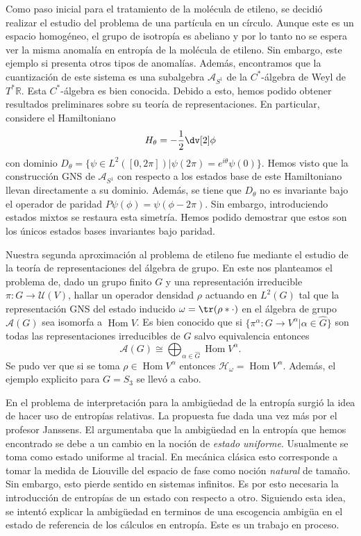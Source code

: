 \documentclass{article}
\DeclareMathOperator{\Hom}{Hom}
\begin{document}
Como paso inicial para el tratamiento de la molécula de etileno, se decidió realizar el estudio del problema de una partícula en un círculo. Aunque este es un espacio homogéneo, el grupo de isotropía es abeliano y por lo tanto no se espera ver la misma anomalía en entropía de la molécula de etileno. Sin embargo, este ejemplo si presenta otros tipos de anomalías\cite{Balachandran2011}. Además, encontramos que la cuantización de este sistema es una subalgebra $\mathcal{A}_{S^1}$ de la $C^*$-álgebra de Weyl de $T^*\mathbb{R}$. Esta $C^*$-álgebra es bien conocida\cite{Moretti2013}. Debido a esto, hemos podido obtener resultados preliminares sobre su teoría de representaciones. En particular, considere el Hamiltoniano 
\begin{equation}
H_\theta=-\frac{1}{2}\dv[2]\phi
\end{equation} 
con dominio $D_\theta=\{\psi\in L^2([0,2\pi])|\psi(2\pi)=e^{i\theta}\psi(0)\}$. Hemos visto que la construcción GNS de $\mathcal{A}_{S^1}$ con respecto a los estados base de este Hamiltoniano llevan directamente a su dominio. Además, se tiene que $D_\theta$ no es invariante bajo el operador de paridad $P\psi(\phi)=\psi(\phi-2\pi)$. Sin embargo, introduciendo estados mixtos se restaura esta simetría. Hemos podido demostrar que estos son los únicos estados bases invariantes bajo paridad.

Nuestra segunda aproximación al problema de etileno fue mediante el estudio de la teoría de representaciones del álgebra de grupo. En este nos planteamos el problema de, dado un grupo finito $G$ y una representación irreducible $\pi:G\rightarrow\mathcal{U}(V)$, hallar un operador densidad $\rho$ actuando en $L^2(G)$ tal que la representación GNS del estado inducido $\omega=\tr(\rho*\cdot)$ en el álgebra de grupo $\mathcal{A}(G)$ sea isomorfa a $\Hom V$. Es bien conocido que si $\{\pi^\alpha:G\rightarrow V^\alpha|\alpha\in\hat{G}\}$ son todas las representaciones irreducibles de $G$ salvo equivalencia entonces 
\begin{equation}
\mathcal{A}(G)\cong\bigoplus_{\alpha\in\hat{G}}\Hom V^\alpha.
\end{equation}
Se pudo ver que si se toma $\rho\in\Hom V^\alpha$ entonces $\mathcal{H}_\omega=\Hom V^\alpha$. Además, el ejemplo explicito para $G=S_3$ se llevó a cabo.

En el problema de interpretación para la ambigüedad de la entropía surgió la idea de hacer uso de entropías relativas. La propuesta fue dada una vez más por el profesor Janssens. El argumentaba que la ambigüedad en la entropía que hemos encontrado se debe a un cambio en la noción de \textit{estado uniforme}. Usualmente se toma como estado uniforme al tracial. En mecánica clásica esto corresponde a tomar la medida de Liouville del espacio de fase como noción \textit{natural} de tamaño. Sin embargo, esto pierde sentido en sistemas infinitos. Es por esto necesaria la introducción de entropías de un estado con respecto a otro. Siguiendo esta idea, se intentó explicar la ambigüedad en terminos de una escogencia ambigüa en el estado de referencia de los cálculos en entropía. Este es un trabajo en proceso.
\end{document}
